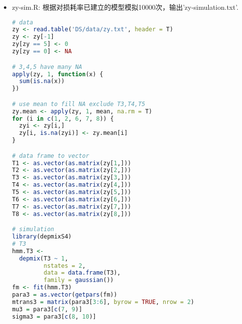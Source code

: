 \documentclass{my_paper}
\begin{document}
\begin{itemize}
\begin{lstlisting}[language=R]
# parameters
para = as.vector(getpars(fm))
mtrans = matrix(para[3:6], byrow = TRUE, nrow = 2)
mu = para[c(7, 9)]
sigma = para[c(8, 10)]
# prediction
set.seed(684586844)
T4.pred <- generate.sample(24, 2, mu, sigma, mtrans, 2)
T4.pred

## T5
# seems no pattern
plot(T5)
T5.narm <- na.exclude(T5)
plot(density(T5.narm),main = 'density of T5')
# exponential distribution
mu <- mean(T5, na.rm = T)
sigma <- var(T5, na.rm = T)
lam <- 1 / mu
x <- seq(0,5,length.out = 100)
lines(x,dexp(x,rate=lam),col = 2)
# prediction
T5.pred <- rexp(24, lam)

## T6
# ar(1)
plot(T6,type = "o")
acf2(T6)
T6.pred <- sarima.for(T6, 24, 1, 0, 0)

## T7
# arima(1,1,0)
plot(T7,type = "o")
acf2(T7)
T7.d <- diff(T7)
acf2(T7.d)
T7.pred <- sarima.for(T7, 24, 1, 1, 0)

## T8
# arima(1,1,0)
plot(T8,type = "o")
acf2(T8)
T8.d <- diff(T8)
acf2(T8.d)
T8.pred <- sarima.for(T8, 24, 1, 1, 0)

zy.pred <- rbind(
  T1.pred$pred,
  T2.pred$pred,
  T3.pred$y,
  T4.pred$y,
  T5.pred,
  T6.pred$pred,
  T7.pred$pred,
  T8.pred$pred
)
row.names(zy.pred) <- c('T1', 'T2', 'T3', 'T4',
                        'T5', 'T6', 'T7', 'T8')
colnames(zy.pred) <- 1:24

write.csv(zy.pred,
            'zy_pred.csv')

\end{lstlisting}

\item zy-sim.R: 根据对损耗率已建立的模型模拟10000次，输出'zy-simulation.txt'.

\begin{lstlisting}[language=R]
# data
zy <- read.table('DS/data/zy.txt', header = T)
zy <- zy[-1]
zy[zy == 5] <- 0
zy[zy == 0] <- NA

# 3,4,5 have many NA
apply(zy, 1, function(x) {
  sum(is.na(x))
})

# use mean to fill NA exclude T3,T4,T5
zy.mean <- apply(zy, 1, mean, na.rm = T)
for (i in c(1, 2, 6, 7, 8)) {
  zyi <- zy[i,]
  zy[i, is.na(zyi)] <- zy.mean[i]
}

# data frame to vector
T1 <- as.vector(as.matrix(zy[1,]))
T2 <- as.vector(as.matrix(zy[2,]))
T3 <- as.vector(as.matrix(zy[3,]))
T4 <- as.vector(as.matrix(zy[4,]))
T5 <- as.vector(as.matrix(zy[5,]))
T6 <- as.vector(as.matrix(zy[6,]))
T7 <- as.vector(as.matrix(zy[7,]))
T8 <- as.vector(as.matrix(zy[8,]))

# simulation
library(depmixS4)
# T3
hmm.T3 <-
  depmix(T3 ~ 1,
         nstates = 2,
         data = data.frame(T3),
         family = gaussian())
fm <- fit(hmm.T3)
para3 = as.vector(getpars(fm))
mtrans3 = matrix(para3[3:6], byrow = TRUE, nrow = 2)
mu3 = para3[c(7, 9)]
sigma3 = para3[c(8, 10)]


\end{lstlisting}
\end{itemize}
\end{document}
